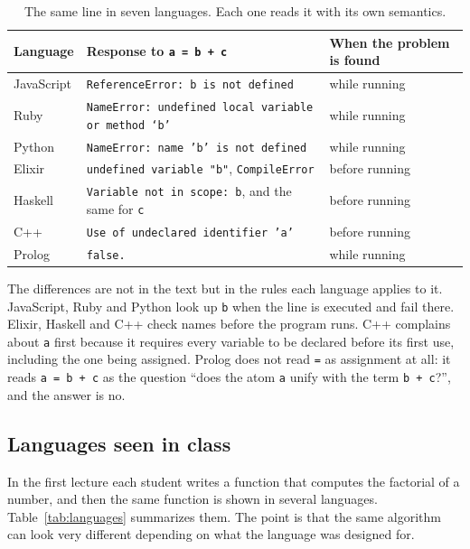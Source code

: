 \begin{table}[h]
\centering
\small
\begin{tabular}{l l l}
  \toprule
  Language & Response to \texttt{a = b + c} & When the problem is found \\
  \midrule
  JavaScript & \texttt{ReferenceError: b is not defined} & while running \\
  Ruby       & \texttt{NameError: undefined local variable or method `b'} & while running \\
  Python     & \texttt{NameError: name 'b' is not defined} & while running \\
  Elixir     & \texttt{undefined variable "b"}, \texttt{CompileError} & before running \\
  Haskell    & \texttt{Variable not in scope: b}, and the same for \texttt{c} & before running \\
  C++        & \texttt{Use of undeclared identifier 'a'} & before running \\
  Prolog     & \texttt{false.} & while running \\
  \bottomrule
\end{tabular}
\caption{The same line in seven languages. Each one reads it with its own semantics.}
\label{tab:abc}
\end{table}

The differences are not in the text but in the rules each language applies to
it. JavaScript, Ruby and Python look up \texttt{b} when the line is executed
and fail there. Elixir, Haskell and C++ check names before the program runs.
C++ complains about \texttt{a} first because it requires every variable to be
declared before its first use, including the one being assigned. Prolog does
not read \texttt{=} as assignment at all: it reads \texttt{a = b + c} as the
question ``does the atom \texttt{a} unify with the term \texttt{b + c}?'', and
the answer is no.

\subsection{Languages seen in class}

In the first lecture each student writes a function that computes the
factorial of a number, and then the same function is shown in several
languages. Table~\ref{tab:languages} summarizes them. The point is that the
same algorithm can look very different depending on what the language was
designed for.

